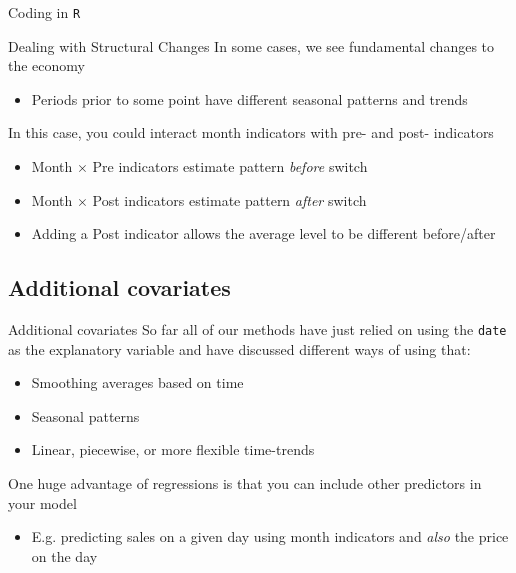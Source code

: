 \documentclass[aspectratio=169,t,11pt,table]{beamer}
\begin{document}

\begin{frame}[fragile]{Coding in \texttt{R}}
\end{frame}

\begin{frame}{Dealing with Structural Changes}
  In some cases, we see fundamental changes to the economy
  \begin{itemize}
    \item Periods prior to some point have different seasonal patterns and trends
  \end{itemize}

  \bigskip
  In this case, you could interact month indicators with pre- and post- indicators 
  \begin{itemize}
    \item Month $\times$ Pre indicators estimate pattern \emph{before} switch
    \item Month $\times$ Post indicators estimate pattern \emph{after} switch
    
    \item Adding a Post indicator allows the average level to be different before/after
  \end{itemize}
\end{frame}


\subsection{Additional covariates}

\begin{frame}{Additional covariates}
  So far all of our methods have just relied on using the \texttt{date} as the explanatory variable and have discussed different ways of using that:
  \begin{itemize}
    \item Smoothing averages based on time
    \item Seasonal patterns
    \item Linear, piecewise, or more flexible time-trends
  \end{itemize}

  \bigskip
  One huge advantage of regressions is that you can include other predictors in your model
  \begin{itemize}
    \item E.g. predicting sales on a given day using month indicators and \emph{also} the price on the day
  \end{itemize}  
\end{frame}
\end{document}
